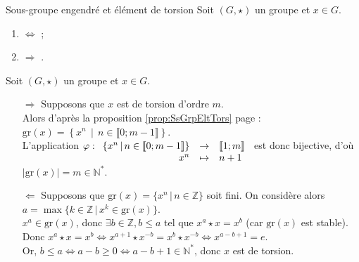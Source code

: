 \documentclass[12pt,a4paper]{report}
\begin{document}
    \begin{corollaires}{Sous-groupe engendré et élément de torsion}{}
    Soit $(G, \star)$ un groupe et $x \in G$.
    \begin{multicols}{2}
    \begin{enumerate}[label=\bfseries\arabic*)]
        \item {} $\Leftrightarrow$  ;
        \item {} $\Rightarrow$ .
    \end{enumerate}
    \end{multicols}
    \end{corollaires}
    
    \begin{demo}
    Soit $(G, \star)$ un groupe et $x \in G$.
    \begin{itemize}
        \item[$\Rightarrow$] Supposons que $x$ est de torsion d'ordre $m$.\\
        Alors d'après la proposition \ref{prop:SsGrpEltTors} page \pageref{prop:SsGrpEltTors} : $\text{gr}(x) = \left\{ x^n \,\middle|\, n \in \llbracket 0 ; m - 1 \rrbracket \right\}$.\\
        L'application $\varphi : \begin{array}[t]{rcl} \left\{ x^n \,\middle|\, n \in \llbracket 0 ; m - 1 \rrbracket \right\} & \rightarrow & \llbracket 1 ; m \rrbracket \\ x^n & \mapsto & n + 1 \end{array}$ est donc bijective, d'où $| \text{gr}(x) | = m \in \mathbb{N}^*$.
        \item[$\Leftarrow$] Supposons que $\text{gr}(x) = \{ x^n \,|\, n \in \mathbb{Z}\}$ soit fini. On considère alors $a = \max\{k \in \mathbb{Z} \,|\, x^k \in \text{gr}(x)\}$.\\
        $x^a \in \text{gr}(x)$, donc $\exists b \in \mathbb{Z}, b \leqslant a$ tel que $x^a \star x = x^b$ (car $\text{gr}(x)$ est stable).\\
        Donc $x^a \star x = x^b \Leftrightarrow x^{a + 1}  \star x^{-b} = x^b \star x^{-b} \Leftrightarrow x^{a - b + 1} = e$.\\
        Or, $b \leqslant a \Leftrightarrow a - b \geqslant 0 \Leftrightarrow a - b + 1 \in \mathbb{N}^*$, donc $x$ est de torsion.
    \end{itemize}
    \end{demo}
    
\end{document}
